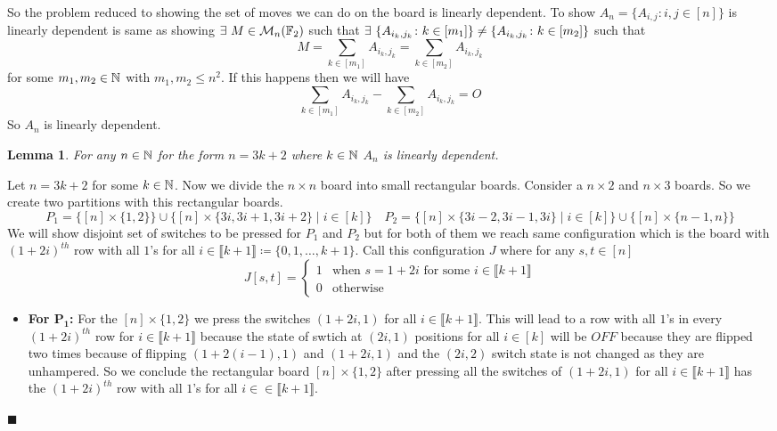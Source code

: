 \documentclass[a4paper, 11pt]{article}
\newtheorem{lemma}{Lemma}
\renewenvironment{proof}{\noindent{\it \textbf{Proof:}}\hspace*{1em}}{\hfill $\blacksquare$\bigskip\\}
\begin{document}
{So the problem reduced to showing the set of moves we can do on the board is linearly dependent. To show $A_n=\{A_{i,j}\colon i,j\in[n]\}$ is linearly dependent is same as showing $\exists \ M\in\mathcal{M}_n(\mathbb{F}_2)$ such that $\exs\ \{A_{i_k,j_k}\colon k\in [m_1]\}\neq \{A_{i_k,j_k}\colon k\in [m_2]\}$ such that $$M=\sum_{k\in [m_1]}A_{i_{k},j_{k}}=\sum_{k\in [m_2]}A_{i_{k},j_{k}}$$for some $m_1,m_2\in\mathbb{N}$ with $m_1,m_2\leq n^2$. If this happens then we will have $$\sum_{k\in [m_1]}A_{i_{k},j_{k}}-\sum_{k\in [m_2]}A_{i_{k},j_{k}}=O$$ So $A_n$ is linearly dependent. 
\begin{lemma}
	For any $n\in\mathbb{N}$ for the form $n=3k+2$ where $k\in\mathbb{N}$ $A_n$ is linearly dependent.
\end{lemma} 
\begin{proof}
	Let $n=3k+2$ for some $k\in\mathbb{N}$. Now we divide the $n\times n$ board into small rectangular boards. Consider a $n\times 2$ and $n\times 3$ boards. So we create two partitions with this rectangular boards.$$P_1=\{[n]\times \{1,2\}\}\cup \{[n]\times \{3i,3i+1,3i+2\}\mid i\in[k] \}\quad P_2=\{[n]\times \{3i-2,3i-1,3i\}\mid i\in[k] \}\cup \{[n]\times \{n-1,n\}\}$$We will show disjoint set of switches to be pressed for $P_1$ and $P_2$ but for both of them we reach same configuration which is the board with $(1+2i)^{th}$ row with all $1$'s for all $i\in\llbracket k+1\rrbracket\coloneqq \{0,1,\dots, k+1\}$. Call this configuration $J$ where for any $s,t\in[n]$ $$J[s,t]=\begin{cases}
		1& \text{when $s=1+2i$ for some $i\in\llbracket k+1\rrbracket$}\\
		0 & \text{otherwise}
	\end{cases}$$
	\begin{itemize}
		\item \textbf{For $\boldsymbol{P_1}$:} For the $[n]\times \{1,2\}$ we press the switches $(1+2i,1)$ for all $i\in\llbracket k+1\rrbracket$. This will lead to a row with all $1$'s in every $(1+2i)^{th}$ row for $i\in\llbracket k+1\rrbracket$ because the state of swtich at $(2i,1)$ positions for all $i\in[k]$ will be $OFF$ because they are flipped two times because of flipping $(1+2(i-1),1)$ and $(1+2i,1)$ and the $(2i,2)$ switch state is not changed as they are unhampered.    So we conclude the rectangular board $[n]\times \{1,2\}$ after pressing all the switches of  $(1+2i,1)$ for all $i\in\llbracket k+1\rrbracket$ has the  $(1+2i)^{th}$ row with all $1$'s for all $i\in\in\llbracket k+1\rrbracket$. \parinn
		

\end{itemize}
\end{proof}}
\end{document}
